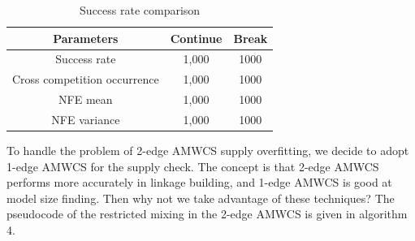 \documentclass{sig-alternate-05-2015}
\begin{document}
\begin{table}[ht]
\centering
\begin{tabular}{ |c|c|c| } \hline
Parameters & Continue & Break \\ \hline
Success rate 					& 1,000& 1000\\ \hline
Cross competition occurrence	& 1,000& 1000\\ \hline
NFE mean				 		& 1,000& 1000\\ \hline
NFE variance					& 1,000& 1000\\ \hline
\end{tabular}
\caption{Success rate comparison}
\end{table}

To handle the problem of 2-edge AMWCS supply overfitting, we decide to adopt 1-edge AMWCS for the supply check. The concept is that 2-edge AMWCS  performs more accurately in linkage building, and 1-edge AMWCS is good at model size finding. Then why not we take advantage of these techniques? The pseudocode of  the restricted mixing in the 2-edge AMWCS is given in algorithm 4.
\end{document}
